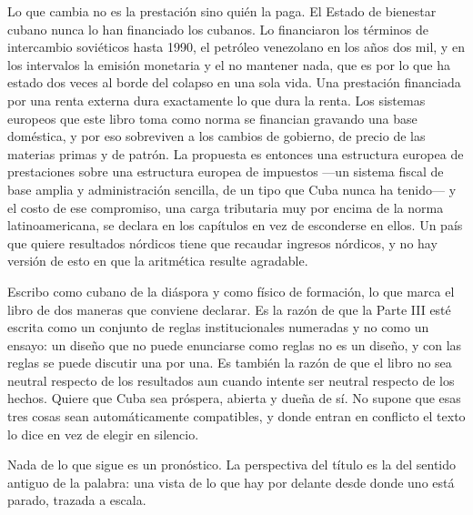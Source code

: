 Lo que cambia no es la prestación sino quién la paga. El Estado de bienestar
cubano nunca lo han financiado los cubanos. Lo financiaron los términos de
intercambio soviéticos hasta 1990, el petróleo venezolano en los años dos mil, y
en los intervalos la emisión monetaria y el no mantener nada, que es por lo que
ha estado dos veces al borde del colapso en una sola vida. Una prestación
financiada por una renta externa dura exactamente lo que dura la renta. Los
sistemas europeos que este libro toma como norma se financian gravando una base
doméstica, y por eso sobreviven a los cambios de gobierno, de precio de las
materias primas y de patrón. La propuesta es entonces una estructura europea de
prestaciones sobre una estructura europea de impuestos ---un sistema fiscal de
base amplia y administración sencilla, de un tipo que Cuba nunca ha tenido--- y
el costo de ese compromiso, una carga tributaria muy por encima de la norma
latinoamericana, se declara en los capítulos en vez de esconderse en ellos. Un
país que quiere resultados nórdicos tiene que recaudar ingresos nórdicos, y no
hay versión de esto en que la aritmética resulte agradable.

Escribo como cubano de la diáspora y como físico de formación, lo que marca el
libro de dos maneras que conviene declarar. Es la razón de que la Parte III esté
escrita como un conjunto de reglas institucionales numeradas y no como un
ensayo: un diseño que no puede enunciarse como reglas no es un diseño, y con las
reglas se puede discutir una por una. Es también la razón de que el libro no sea
neutral respecto de los resultados aun cuando intente ser neutral respecto de
los hechos. Quiere que Cuba sea próspera, abierta y dueña de sí. No supone que
esas tres cosas sean automáticamente compatibles, y donde entran en conflicto el
texto lo dice en vez de elegir en silencio.

Nada de lo que sigue es un pronóstico. La perspectiva del título es la del
sentido antiguo de la palabra: una vista de lo que hay por delante desde donde
uno está parado, trazada a escala.
